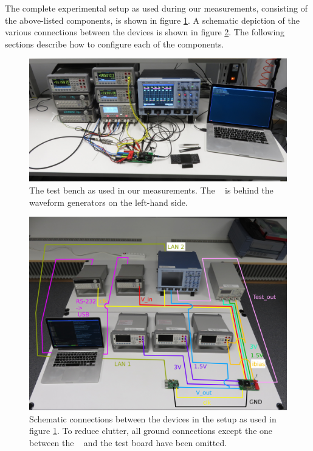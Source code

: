 The complete experimental setup as used during our measurements, consisting of
the above-listed components, is shown in figure \ref{fig:testBenchComplete}. A
schematic depiction of the various connections between the devices is shown in
figure \ref{fig:testBenchConnections}. The following  sections describe how to
configure each of the components.

\begin{figure}
    \includegraphics[width=\textwidth]{images/expSetup/testBenchComplete.jpeg}
    \caption{
        The test bench as used in  our measurements. The \raspi~ is behind the
        waveform generators on the left-hand side.%
    }
    \label{fig:testBenchComplete}
\end{figure}

\begin{figure}
    \includegraphics[width=\textwidth]{images/expSetup/testBenchConnections.jpeg}
    \caption{%
        Schematic  connections between  the devices  in the  setup as  used in
        figure  \ref{fig:testBenchComplete}. To  reduce  clutter,  all  ground
        connections except the one between the \raspi~ and the test board have
        been omitted.%
    }
    \label{fig:testBenchConnections}
\end{figure}


